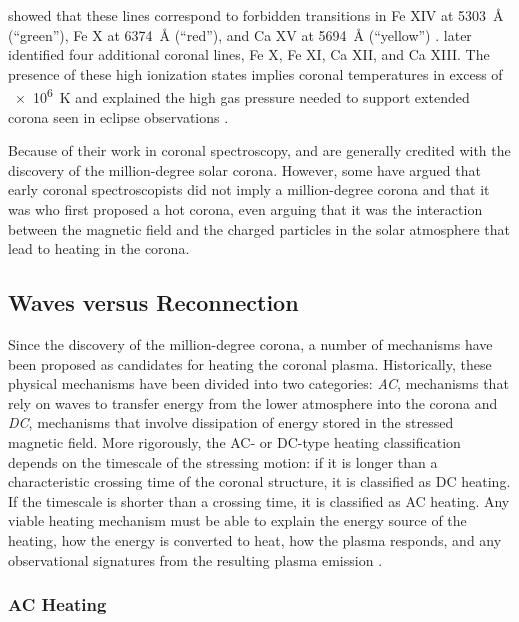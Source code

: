 \citet{grotrian_zur_1939} showed that these lines correspond to forbidden transitions in Fe XIV at \SI{5303}{\angstrom} (``green''), Fe X at \SI{6374}{\angstrom} (``red''), and Ca XV at \SI{5694}{\angstrom} (``yellow'') \citep[from Table 2.1 of][]{golub_solar_2010}. \citet{edlen_deutung_1943} later identified four additional coronal lines, Fe X, Fe XI, Ca XII, and Ca XIII. The presence of these high ionization states implies coronal temperatures in excess of \SI{e6}{\kelvin} and explained the high gas pressure needed to support extended corona seen in eclipse observations \citep{golub_solar_2010}.

Because of their work in coronal spectroscopy, \citet{grotrian_zur_1939} and \citet{edlen_deutung_1943} are generally credited with the discovery of the million-degree solar corona. However, some \citep[see][]{peter_discovery_2014} have argued that early coronal spectroscopists did not imply a million-degree corona and that it was \citet{alfven_solar_1941} who first proposed a hot corona, even arguing that it was the interaction between the magnetic field and the charged particles in the solar atmosphere that lead to heating in the corona.

\subsection{Waves versus Reconnection}\label{sec:waves-reconnection}

Since the discovery of the million-degree corona, a number of mechanisms have been proposed as candidates for heating the coronal plasma. Historically, these physical mechanisms have been divided into two categories: \textit{AC}, mechanisms that rely on waves to transfer energy from the lower atmosphere into the corona and \textit{DC}, mechanisms that involve dissipation of energy stored in the stressed magnetic field. More rigorously, the AC- or DC-type heating classification depends on the timescale of the stressing motion: if it is longer than a characteristic crossing time of the coronal structure, it is classified as DC heating. If the timescale is shorter than a crossing time, it is classified as AC heating. Any viable heating mechanism must be able to explain the energy source of the heating, how the energy is converted to heat, how the plasma responds, and any observational signatures from the resulting plasma emission \citep[see Figure 1 of][]{klimchuk_solving_2006}.

\subsubsection{AC Heating}\label{sec:ac-heating}

